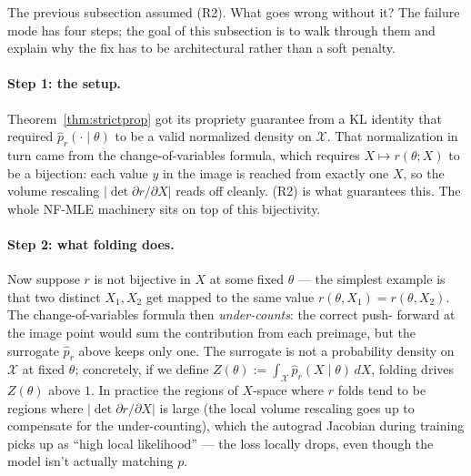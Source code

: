\documentclass[11pt]{article}
\begin{document}
The previous subsection assumed (R2). What goes wrong without it?
The failure mode has four steps; the goal of this subsection is to
walk through them and explain why the fix has to be architectural
rather than a soft penalty.

\paragraph{Step 1: the setup.}
Theorem~\ref{thm:strictprop} got its propriety guarantee from a KL
identity that required \(\hat p_r(\cdot \mid \theta)\) to be a valid
normalized density on \(\mathcal{X}\). That normalization in turn came
from the change-of-variables formula, which requires
\(X \mapsto r(\theta; X)\) to be a bijection: each value \(y\) in the
image is reached from exactly one \(X\), so the volume rescaling
\(|\det \partial r / \partial X|\) reads off cleanly. (R2) is what
guarantees this. The whole NF-MLE machinery sits on top of this
bijectivity.

\paragraph{Step 2: what folding does.}
Now suppose \(r\) is not bijective in \(X\) at some fixed \(\theta\) ---
the simplest example is that two distinct \(X_1, X_2\) get mapped to
the same value \(r(\theta, X_1) = r(\theta, X_2)\). The
change-of-variables formula then \emph{under-counts}: the correct push-
forward at the image point would sum the contribution from each
preimage, but the surrogate \(\hat p_r\) above keeps only one. The
surrogate is not a probability density on \(\mathcal{X}\) at fixed
\(\theta\); concretely, if we define
\(Z(\theta) := \int_\mathcal{X} \hat p_r(X \mid \theta)\,dX\), folding
drives \(Z(\theta)\) above \(1\). In practice the regions of
\(X\)-space where \(r\) folds tend to be regions where
\(|\det \partial r / \partial X|\) is large (the local volume rescaling
goes up to compensate for the under-counting), which the autograd
Jacobian during training picks up as ``high local likelihood'' --- the
loss locally drops, even though the model isn't actually matching \(p\).
\end{document}
